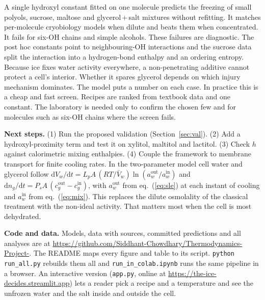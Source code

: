 \documentclass[10pt,a4paper,twocolumn]{article}
\begin{document}
A single hydroxyl constant fitted on one molecule predicts the freezing of small polyols, sucrose, maltose and
glycerol\,+\,salt mixtures without refitting. It matches per-molecule cryobiology models when dilute and beats
them when concentrated. It fails for six-OH chains and simple alcohols. These failures are diagnostic. The post
hoc constants point to neighbouring-OH interactions and the sucrose data split the interaction into a
hydrogen-bond enthalpy and an ordering entropy. Because ice fixes water activity everywhere, a non-penetrating
additive cannot protect a cell's interior. Whether it spares glycerol depends on which injury mechanism
dominates. The model puts a number on each case. In practice this is a cheap and fast screen. Recipes are
ranked from textbook data and one constant. The laboratory is needed only to confirm the chosen few and for
molecules such as six-OH chains where the screen fails.

\textbf{Next steps.} (1) Run the proposed validation (Section~\ref{sec:val}). (2) Add a hydroxyl-proximity term
and test it on xylitol, maltitol and lactitol. (3) Check $h$ against calorimetric mixing enthalpies. (4) Couple
the framework to membrane transport for finite cooling rates. In the two-parameter model \cite{kleinhans2p}
cell water and glycerol follow
$\mathrm{d}V_w/\mathrm{d}t=L_pA\,(RT/\bar V_w)\ln(a_w^{\mathrm{out}}/a_w^{\mathrm{in}})$ and
$\mathrm{d}n_g/\mathrm{d}t=P_sA\,(c_g^{\mathrm{out}}-c_g^{\mathrm{in}})$, with $a_w^{\mathrm{out}}$ from
eq.~(\ref{eq:sle}) at each instant of cooling and $a_w^{\mathrm{in}}$ from eq.~(\ref{eq:mix}). This replaces
the dilute osmolality of the classical treatment \cite{mazur63} with the non-ideal activity. That matters most
when the cell is most dehydrated.

{\footnotesize\textbf{Code and data.} Models, data with sources, committed predictions and all analyses are at
\url{https://github.com/Siddhant-Chowdhary/Thermodynamics-Project-}. The README maps every figure and table to
its script. \texttt{python run\_all.py} rebuilds them all and \texttt{run\_in\_colab.ipynb} runs the same
pipeline in a browser. An interactive version (\texttt{app.py}, online at
\url{https://the-ice-decides.streamlit.app}) lets a reader pick a recipe and a temperature and see the unfrozen
water and the salt inside and outside the cell.\par}
\end{document}
